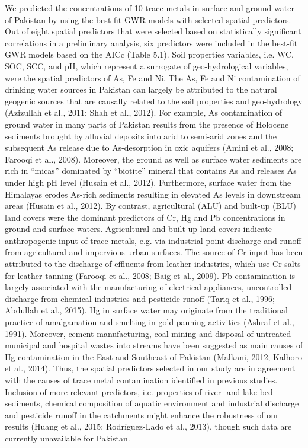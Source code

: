 We predicted the concentrations of 10 trace metals in surface and ground water of Pakistan by using the best-fit GWR models with selected spatial predictors. Out of eight spatial predictors that were selected based on statistically significant correlations in a preliminary analysis, six predictors were included in the best-fit GWR models based on the AICc (Table 5.1). Soil properties variables, i.e. WC, SOC, SCC, and pH, which represent a surrogate of geo-hydrological variables, were the spatial predictors of As, Fe and Ni. The As, Fe and Ni contamination of drinking water sources in Pakistan can largely be attributed to the natural geogenic sources that are causally related to the soil properties and geo-hydrology (Azizullah et al., 2011; Shah et al., 2012). For example, As contamination of ground water in many parts of Pakistan results from the presence of Holocene sediments brought by alluvial deposits into arid to semi-arid zones and the subsequent As release due to As-desorption in oxic aquifers (Amini et al., 2008; Farooqi et al., 2008). Moreover, the ground as well as surface water sediments are rich in “micas” dominated by “biotite” mineral that contains As and releases As under high pH level (Husain et al., 2012). Furthermore, surface water from the Himalayas erodes As-rich sediments resulting in elevated As levels in downstream areas (Husain et al., 2012). By contrast, agricultural (ALU) and built-up (BLU) land covers were the dominant predictors of Cr, Hg and Pb concentrations in ground and surface waters. Agricultural and built-up land covers indicate anthropogenic input of trace metals, e.g. via industrial point discharge and runoff from agricultural and impervious urban surfaces. The source of Cr input has been attributed to the discharge of effluents from leather industries, which use Cr-salts for leather tanning (Farooqi et al., 2008; Baig et al., 2009). Pb contamination is largely associated with the manufacturing of electrical appliances, uncontrolled discharge from chemical industries and pesticide runoff (Tariq et al., 1996; Abdullah et al., 2015). Hg in surface water may originate from the traditional practice of amalgamation and smelting in gold panning activities (Ashraf et al., 1991). Moreover, cement manufacturing, coal mining and disposal of untreated municipal and hospital wastes into streams have been suggested as main causes of Hg contamination in the East and Southeast of Pakistan (Malkani, 2012; Kalhoro et al., 2014). Thus, the spatial predictors selected in our study are in agreement with the causes of trace metal contamination identified in previous studies. Inclusion of more relevant predictors, i.e. properties of river- and lake-bed sediments, chemical composition of aquatic environment and industrial discharge and pesticide runoff in the catchments might enhance the robustness of our results (Huang et al., 2015; Rodríguez-Lado et al., 2013), though such data are currently unavailable for Pakistan.

